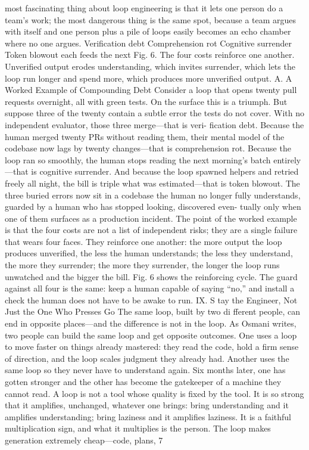 \documentclass[conference]{IEEEtran}
\begin{document}
most fascinating thing about loop engineering is that it lets one
person do a team’s work; the most dangerous thing is the same
spot, because a team argues with itself and one person plus a pile
of loops easily becomes an echo chamber where no one argues.
Verification
debt
Comprehension
rot
Cognitive
surrender
Token
blowout
each feeds
the next
Fig. 6. The four costs reinforce one another. Unverified output erodes
understanding, which invites surrender, which lets the loop run longer
and spend more, which produces more unverified output.
A. A Worked Example of Compounding Debt
Consider a loop that opens twenty pull requests overnight, all
with green tests. On the surface this is a triumph. But suppose
three of the twenty contain a subtle error the tests do not cover.
With no independent evaluator, those three merge—that is veri-
fication debt. Because the human merged twenty PRs without
reading them, their mental model of the codebase now lags by
twenty changes—that is comprehension rot. Because the loop
ran so smoothly, the human stops reading the next morning’s
batch entirely—that is cognitive surrender. And because the loop
spawned helpers and retried freely all night, the bill is triple what
was estimated—that is token blowout. The three buried errors
now sit in a codebase the human no longer fully understands,
guarded by a human who has stopped looking, discovered even-
tually only when one of them surfaces as a production incident.
The point of the worked example is that the four costs are not
a list of independent risks; they are a single failure that wears
four faces. They reinforce one another: the more output the
loop produces unverified, the less the human understands; the
less they understand, the more they surrender; the more they
surrender, the longer the loop runs unwatched and the bigger
the bill. Fig. 6 shows the reinforcing cycle. The guard against
all four is the same: keep a human capable of saying “no,” and
install a check the human does not have to be awake to run.
IX. S tay the Engineer, Not Just the One Who Presses Go
The same loop, built by two di fferent people, can end in
opposite places—and the difference is not in the loop. As Osmani
writes, two people can build the same loop and get opposite
outcomes. One uses a loop to move faster on things already
mastered: they read the code, hold a firm sense of direction, and
the loop scales judgment they already had. Another uses the
same loop so they never have to understand again. Six months
later, one has gotten stronger and the other has become the
gatekeeper of a machine they cannot read.
A loop is not a tool whose quality is fixed by the tool. It is so
strong that it amplifies, unchanged, whatever one brings: bring
understanding and it amplifies understanding; bring laziness and
it amplifies laziness. It is a faithful multiplication sign, and what
it multiplies is the person.
The loop makes generation extremely cheap—code, plans,
7
\end{document}

